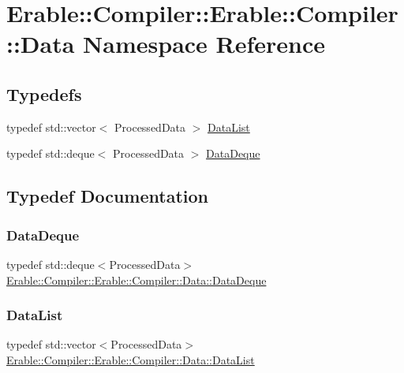 \hypertarget{namespace_erable_1_1_compiler_1_1_erable_1_1_compiler_1_1_data}{}\section{Erable\+::Compiler\+::Erable\+::Compiler\+::Data Namespace Reference}
\label{namespace_erable_1_1_compiler_1_1_erable_1_1_compiler_1_1_data}
\subsection*{Typedefs}
\begin{DoxyCompactItemize}
\item 
typedef std\+::vector$<$ Processed\+Data $>$ \mbox{\hyperlink{namespace_erable_1_1_compiler_1_1_erable_1_1_compiler_1_1_data_aaf94dfc3853d6487c6bd26d8622b2148}{Data\+List}}
\item 
typedef std\+::deque$<$ Processed\+Data $>$ \mbox{\hyperlink{namespace_erable_1_1_compiler_1_1_erable_1_1_compiler_1_1_data_a92ff0b35cca0610c3a6e675c9eef1566}{Data\+Deque}}
\end{DoxyCompactItemize}


\subsection{Typedef Documentation}
\mbox{\label{namespace_erable_1_1_compiler_1_1_erable_1_1_compiler_1_1_data_a92ff0b35cca0610c3a6e675c9eef1566}} 
\subsubsection{\texorpdfstring{DataDeque}{DataDeque}}
{\footnotesize\ttfamily typedef std\+::deque$<$Processed\+Data$>$ \mbox{\hyperlink{namespace_erable_1_1_compiler_1_1_erable_1_1_compiler_1_1_data_a92ff0b35cca0610c3a6e675c9eef1566}{Erable\+::\+Compiler\+::\+Erable\+::\+Compiler\+::\+Data\+::\+Data\+Deque}}}

\mbox{\label{namespace_erable_1_1_compiler_1_1_erable_1_1_compiler_1_1_data_aaf94dfc3853d6487c6bd26d8622b2148}} 
\subsubsection{\texorpdfstring{DataList}{DataList}}
{\footnotesize\ttfamily typedef std\+::vector$<$Processed\+Data$>$ \mbox{\hyperlink{namespace_erable_1_1_compiler_1_1_erable_1_1_compiler_1_1_data_aaf94dfc3853d6487c6bd26d8622b2148}{Erable\+::\+Compiler\+::\+Erable\+::\+Compiler\+::\+Data\+::\+Data\+List}}}

